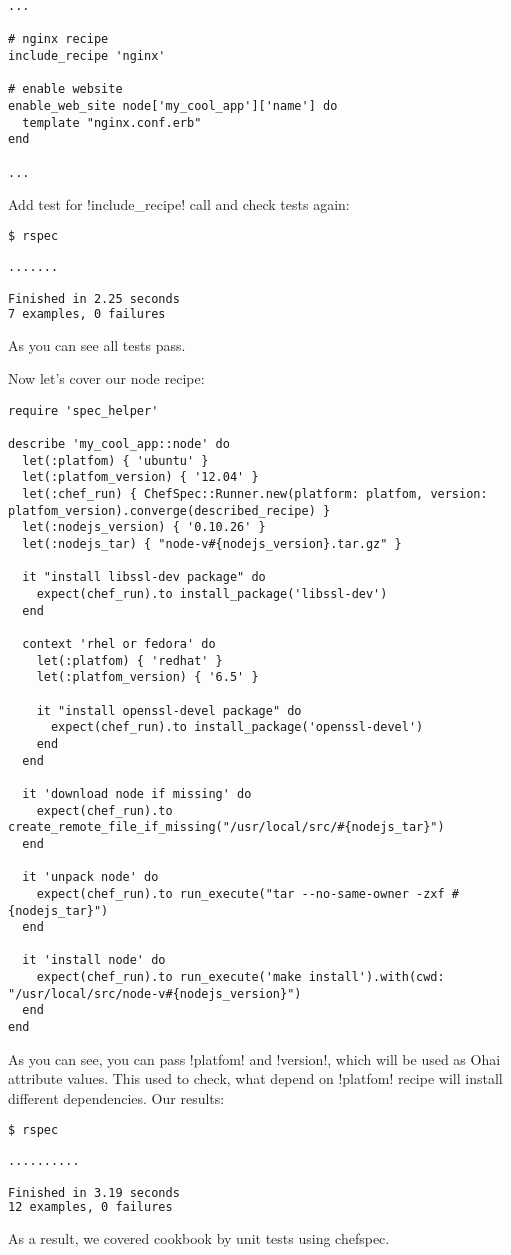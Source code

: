 \begin{lstlisting}[label=lst:testing-chefspec6,title=my-server-cloud/site-cookbooks/my\_cool\_app/recipes/default.rb]
...

# nginx recipe
include_recipe 'nginx'

# enable website
enable_web_site node['my_cool_app']['name'] do
  template "nginx.conf.erb"
end

...
\end{lstlisting}

Add test for \inline!include_recipe! call and check tests again:

\begin{lstlisting}[language=Bash,label=lst:testing-chefspec7]
$ rspec

.......

Finished in 2.25 seconds
7 examples, 0 failures
\end{lstlisting}

As you can see all tests pass.

Now let's cover our node recipe:

\begin{lstlisting}[label=lst:testing-chefspec8,title=my-server-cloud/site-cookbooks/my\_cool\_app/spec/unit/recipes/node\_spec.rb]
require 'spec_helper'

describe 'my_cool_app::node' do
  let(:platfom) { 'ubuntu' }
  let(:platfom_version) { '12.04' }
  let(:chef_run) { ChefSpec::Runner.new(platform: platfom, version: platfom_version).converge(described_recipe) }
  let(:nodejs_version) { '0.10.26' }
  let(:nodejs_tar) { "node-v#{nodejs_version}.tar.gz" }

  it "install libssl-dev package" do
    expect(chef_run).to install_package('libssl-dev')
  end

  context 'rhel or fedora' do
    let(:platfom) { 'redhat' }
    let(:platfom_version) { '6.5' }

    it "install openssl-devel package" do
      expect(chef_run).to install_package('openssl-devel')
    end
  end

  it 'download node if missing' do
    expect(chef_run).to create_remote_file_if_missing("/usr/local/src/#{nodejs_tar}")
  end

  it 'unpack node' do
    expect(chef_run).to run_execute("tar --no-same-owner -zxf #{nodejs_tar}")
  end

  it 'install node' do
    expect(chef_run).to run_execute('make install').with(cwd: "/usr/local/src/node-v#{nodejs_version}")
  end
end
\end{lstlisting}

As you can see, you can pass \inline!platfom! and \inline!version!, which will be used as Ohai attribute values. This used to check, what depend on \inline!platfom! recipe will install different dependencies. Our results:

\begin{lstlisting}[language=Bash,label=lst:testing-chefspec9]
$ rspec

..........

Finished in 3.19 seconds
12 examples, 0 failures
\end{lstlisting}

As a result, we covered cookbook by unit tests using chefspec.